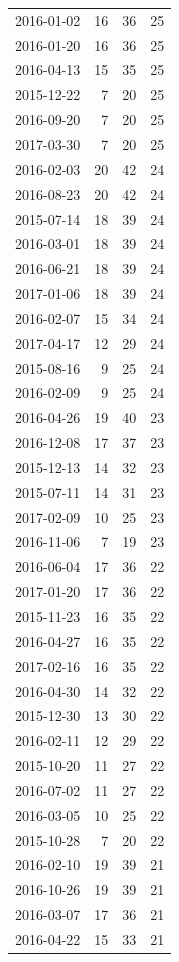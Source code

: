 \begin{tabular}{lrrr}
2016-01-02 & 16 & 36 & 25 \\
2016-01-20 & 16 & 36 & 25 \\
2016-04-13 & 15 & 35 & 25 \\
2015-12-22 & 7 & 20 & 25 \\
2016-09-20 & 7 & 20 & 25 \\
2017-03-30 & 7 & 20 & 25 \\
2016-02-03 & 20 & 42 & 24 \\
2016-08-23 & 20 & 42 & 24 \\
2015-07-14 & 18 & 39 & 24 \\
2016-03-01 & 18 & 39 & 24 \\
2016-06-21 & 18 & 39 & 24 \\
2017-01-06 & 18 & 39 & 24 \\
2016-02-07 & 15 & 34 & 24 \\
2017-04-17 & 12 & 29 & 24 \\
2015-08-16 & 9 & 25 & 24 \\
2016-02-09 & 9 & 25 & 24 \\
2016-04-26 & 19 & 40 & 23 \\
2016-12-08 & 17 & 37 & 23 \\
2015-12-13 & 14 & 32 & 23 \\
2015-07-11 & 14 & 31 & 23 \\
2017-02-09 & 10 & 25 & 23 \\
2016-11-06 & 7 & 19 & 23 \\
2016-06-04 & 17 & 36 & 22 \\
2017-01-20 & 17 & 36 & 22 \\
2015-11-23 & 16 & 35 & 22 \\
2016-04-27 & 16 & 35 & 22 \\
2017-02-16 & 16 & 35 & 22 \\
2016-04-30 & 14 & 32 & 22 \\
2015-12-30 & 13 & 30 & 22 \\
2016-02-11 & 12 & 29 & 22 \\
2015-10-20 & 11 & 27 & 22 \\
2016-07-02 & 11 & 27 & 22 \\
2016-03-05 & 10 & 25 & 22 \\
2015-10-28 & 7 & 20 & 22 \\
2016-02-10 & 19 & 39 & 21 \\
2016-10-26 & 19 & 39 & 21 \\
2016-03-07 & 17 & 36 & 21 \\
2016-04-22 & 15 & 33 & 21 \\

\end{tabular}
